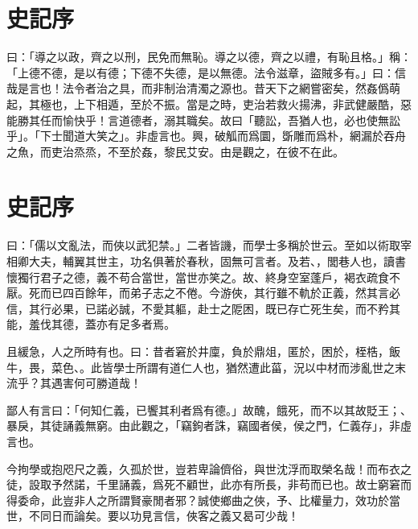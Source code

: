 \theendnotes

\section[酷吏列傳序\quad{\small 史記}]{{\normalsize 史記}\quad {}序}
曰：「導之以政，齊之以刑，民免而無恥。導之以德，齊之以禮，有恥且格。」稱：「上德不德，是以有德；下德不失德，是以無德。法令滋章，盜賊多有。」曰：信哉是言也！法令者治之具，而非制治清濁之源也。昔天下之網嘗密矣，然姦僞萌起，其極也，上下相遁，至於不振。當是之時，吏治若救火揚沸，非武健嚴酷，惡能勝其任而愉快乎！言道德者，溺其職矣。故曰「聽訟，吾猶人也，必也使無訟乎」。「下士聞道大笑之」。非虛言也。興，破觚而爲圜，斲雕而爲朴，網漏於吞舟之魚，而吏治烝烝，不至於姦，黎民艾安。由是觀之，在彼不在此。

\theendnotes

\section[游俠列傳序\quad{\small 史記}]{{\normalsize 史記}\quad {}序}
曰：「儒以文亂法，而俠以武犯禁。」二者皆譏，而學士多稱於世云。至如以術取宰相卿大夫，輔翼其世主，功名俱著於春秋，固無可言者。及若、，閭巷人也，讀書懷獨行君子之德，義不苟合當世，當世亦笑之。故、終身空室蓬戶，褐衣疏食不厭。死而已四百餘年，而弟子志之不倦。今游俠，其行雖不軌於正義，然其言必信，其行必果，已諾必誠，不愛其軀，赴士之阸困，既已存亡死生矣，而不矜其能，羞伐其德，蓋亦有足多者焉。

且緩急，人之所時有也。曰：昔者窘於井廩，負於鼎俎，匿於，困於，桎梏，飯牛，畏，菜色、。此皆學士所謂有道仁人也，猶然遭此菑，況以中材而涉亂世之末流乎？其遇害何可勝道哉！

鄙人有言曰：「何知仁義，已饗其利者爲有德。」故醜，餓死，而不以其故貶王；、暴戾，其徒誦義無窮。由此觀之，「竊鉤者誅，竊國者侯，侯之門，仁義存」，非虛言也。

今拘學或抱咫尺之義，久孤於世，豈若卑論儕俗，與世沈浮而取榮名哉！而布衣之徒，設取予然諾，千里誦義，爲死不顧世，此亦有所長，非苟而已也。故士窮窘而得委命，此豈非人之所謂賢豪閒者邪？誠使鄉曲之俠，予、比權量力，效功於當世，不同日而論矣。要以功見言信，俠客之義又曷可少哉！

